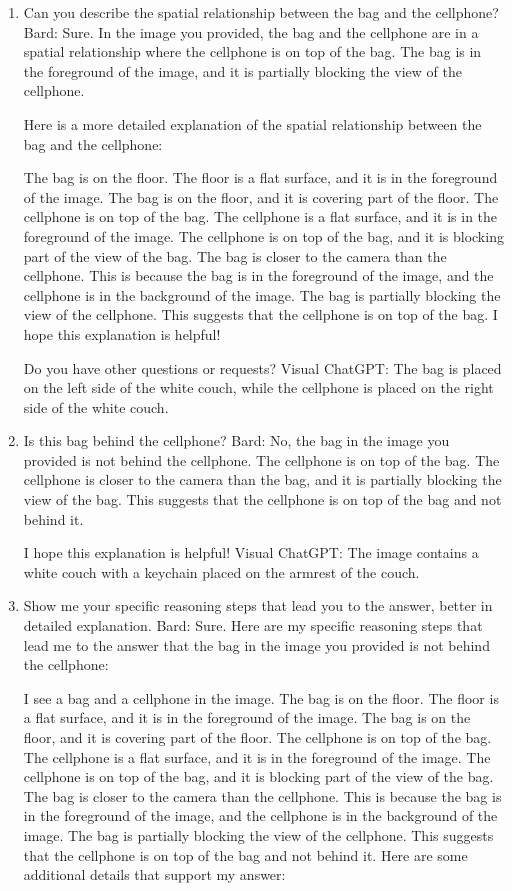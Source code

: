 \begin{enumerate}
    \item Can you describe the spatial relationship between the bag and the cellphone?
    \subitem Bard: Sure. In the image you provided, the bag and the cellphone are in a spatial relationship where the cellphone is on top of the bag. The bag is in the foreground of the image, and it is partially blocking the view of the cellphone.

    Here is a more detailed explanation of the spatial relationship between the bag and the cellphone:
    
    The bag is on the floor. The floor is a flat surface, and it is in the foreground of the image. The bag is on the floor, and it is covering part of the floor.
    The cellphone is on top of the bag. The cellphone is a flat surface, and it is in the foreground of the image. The cellphone is on top of the bag, and it is blocking part of the view of the bag.
    The bag is closer to the camera than the cellphone. This is because the bag is in the foreground of the image, and the cellphone is in the background of the image.
    The bag is partially blocking the view of the cellphone. This suggests that the cellphone is on top of the bag.
    I hope this explanation is helpful!
    
    Do you have other questions or requests?
    \subitem Visual ChatGPT: The bag is placed on the left side of the white couch, while the cellphone is placed on the right side of the white couch.
    \item Is this bag behind the cellphone?
    \subitem Bard: No, the bag in the image you provided is not behind the cellphone. The cellphone is on top of the bag. The cellphone is closer to the camera than the bag, and it is partially blocking the view of the bag. This suggests that the cellphone is on top of the bag and not behind it.

    I hope this explanation is helpful!
    \subitem Visual ChatGPT: The image contains a white couch with a keychain placed on the armrest of the couch.
    \item Show me your specific reasoning steps that lead you to the answer, better in detailed explanation.
    \subitem Bard: 
    Sure. Here are my specific reasoning steps that lead me to the answer that the bag in the image you provided is not behind the cellphone:
    
    I see a bag and a cellphone in the image.
    The bag is on the floor. The floor is a flat surface, and it is in the foreground of the image. The bag is on the floor, and it is covering part of the floor.
    The cellphone is on top of the bag. The cellphone is a flat surface, and it is in the foreground of the image. The cellphone is on top of the bag, and it is blocking part of the view of the bag.
    The bag is closer to the camera than the cellphone. This is because the bag is in the foreground of the image, and the cellphone is in the background of the image.
    The bag is partially blocking the view of the cellphone. This suggests that the cellphone is on top of the bag and not behind it.
    Here are some additional details that support my answer:
    

\end{enumerate}
